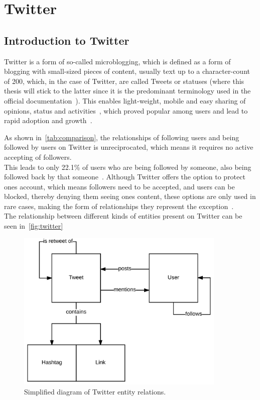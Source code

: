\chapter{Twitter}
\label{ch:twitter}

\section{Introduction to Twitter}
\label{sec:twitter}

Twitter is a form of so-called microblogging, which is defined as a form of blogging with small-sized pieces of content,
usually text up to a character-count of 200, which, in the case of Twitter, are called Tweets or statuses
(where this thesis will stick to the latter since it is the predominant terminology used in the official documentation~\cite{twitterDocs}).
This enables light-weight, mobile and easy sharing of opinions, status and activities~\cite{Finin2007},
which proved popular among users and lead to rapid adoption and growth~\cite{mcgiboney2009twitter}.
\par
As shown in~\autoref{tab:comparison}, the relationships of following users and being followed by users on Twitter is unreciprocated,
which means it requires no active accepting of followers.\\
This leads to only 22.1\% of users who are being followed by someone, also being followed back by that someone~\cite{Kwak2010}.
Although Twitter offers the option to protect ones account, which means followers need to be accepted,
and users can be blocked, thereby denying them seeing ones content, these options are only used in rare cases,
making the form of relationships they represent the exception~\cite{Kwak2010}.\\
The relationship between different kinds of entities present on Twitter can be seen in~\autoref{fig:twitter}
\par

\begin{figure}
    \centering
    \caption{Simplified diagram of Twitter entity relations.}
    \label{fig:twitter}
    \includegraphics[width=10cm]{../figures/twitter_er.pdf}
\end{figure}


